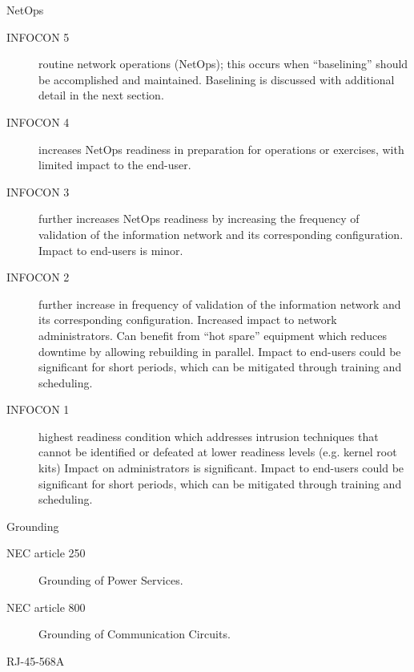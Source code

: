 \documentclass[landscape,fontscale=1,margin=0.2cm,paperwidth=70truecm, paperheight=40truecm,debug]{baposter}
\begin{document}
\begin{poster}
\begin{posterbox}[column=2]{NetOps}
\begin{description}
\item[INFOCON 5] routine network operations (NetOps); this occurs when ``baselining'' should be accomplished and maintained. Baselining is discussed with additional detail in the next section.
\item[INFOCON 4] increases NetOps readiness in preparation for operations or exercises, with limited impact to the end-user.
\item[INFOCON 3] further increases NetOps readiness by increasing the frequency of validation of the information network and its corresponding configuration. Impact to end-users is minor.
\item[INFOCON 2] further increase in frequency of validation of the information network and its corresponding configuration. Increased impact to network administrators. Can benefit from ``hot spare'' equipment which reduces downtime by allowing rebuilding in parallel. Impact to end-users could be significant for short periods, which can be mitigated through training and scheduling.
\item[INFOCON 1] highest readiness condition which addresses intrusion techniques that cannot be identified or defeated at lower readiness levels (e.g. kernel root kits) Impact on administrators is significant. Impact to end-users could be significant for short periods, which can be mitigated through training and scheduling.
\end{description}
\end{posterbox}
\begin{posterbox}[column=2,below=auto,textborder=rounded]{Grounding}
\begin{description}
\item[NEC article 250] Grounding of Power Services.
\item[NEC article 800] Grounding of Communication Circuits.
\end{description}
\end{posterbox}
\begin{posterbox}[column=2,below=auto,textborder=rounded]{RJ-45-568A}
\begin{center}

\end{center}
\end{posterbox}
\end{poster}
\end{document}
